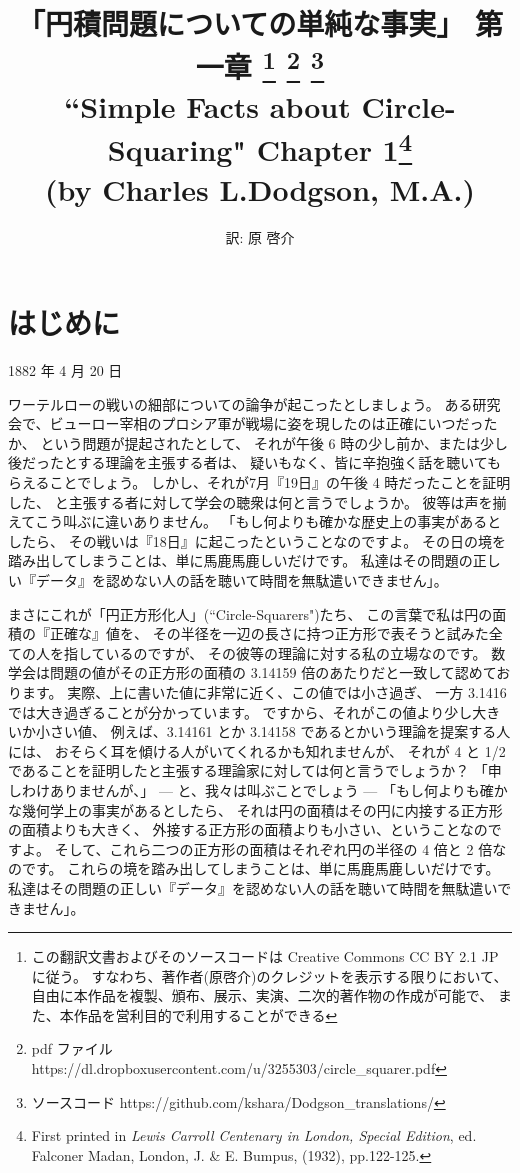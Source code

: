 \documentclass{article}
\title{「円積問題についての単純な事実」 第一章
    \footnote{この翻訳文書およびそのソースコードは
    Creative Commons CC BY 2.1 JP に従う。
    すなわち、著作者(原啓介)のクレジットを表示する限りにおいて、
    自由に本作品を複製、頒布、展示、実演、二次的著作物の作成が可能で、
    また、本作品を営利目的で利用することができる}
    \footnote{pdf ファイル https://dl.dropboxusercontent.com/u/3255303/circle\_squarer.pdf}
    \footnote{ソースコード https://github.com/kshara/Dodgson\_translations/}
    \\
    \smallskip
    {\large
        ``Simple Facts about Circle-Squaring" Chapter 1\footnote{
            First printed in {\it Lewis Carroll Centenary in London,
            Special Edition},
            ed. Falconer Madan, London, J. \& E. Bumpus, (1932), pp.122-125.}
     \\
    (by Charles L.Dodgson, M.A.)
    }
}
\author{訳: 原 啓介}
\begin{document}
\maketitle


\section{はじめに}
\begin{flushright}
1882 年 4 月 20 日
\end{flushright}
 ワーテルローの戦いの細部についての論争が起こったとしましょう。
ある研究会で、ビューロー宰相のプロシア軍が戦場に姿を現したのは正確にいつだったか、
という問題が提起されたとして、
それが午後 6 時の少し前か、または少し後だったとする理論を主張する者は、
疑いもなく、皆に辛抱強く話を聴いてもらえることでしょう。
しかし、それが7月『19日』の午後 4 時だったことを証明した、
と主張する者に対して学会の聴衆は何と言うでしょうか。
彼等は声を揃えてこう叫ぶに違いありません。
「もし何よりも確かな歴史上の事実があるとしたら、
その戦いは『18日』に起こったということなのですよ。
その日の境を踏み出してしまうことは、単に馬鹿馬鹿しいだけです。
私達はその問題の正しい『データ』を認めない人の話を聴いて時間を無駄遣いできません」。

まさにこれが「円正方形化人」(``Circle-Squarers")たち、
この言葉で私は円の面積の『正確な』値を、
その半径を一辺の長さに持つ正方形で表そうと試みた全ての人を指しているのですが、
その彼等の理論に対する私の立場なのです。
数学会は問題の値がその正方形の面積の 3.14159 倍のあたりだと一致して認めております。
実際、上に書いた値に非常に近く、この値では小さ過ぎ、
一方 3.1416 では大き過ぎることが分かっています。
ですから、それがこの値より少し大きいか小さい値、
例えば、3.14161 とか 3.14158 であるとかいう理論を提案する人には、
おそらく耳を傾ける人がいてくれるかも知れませんが、
それが 4 と 1/2 であることを証明したと主張する理論家に対しては何と言うでしょうか？
「申しわけありませんが、」 — と、我々は叫ぶことでしょう —
「もし何よりも確かな幾何学上の事実があるとしたら、
それは円の面積はその円に内接する正方形の面積よりも大きく、
外接する正方形の面積よりも小さい、ということなのですよ。
そして、これら二つの正方形の面積はそれぞれ円の半径の 4 倍と 2 倍なのです。
これらの境を踏み出してしまうことは、単に馬鹿馬鹿しいだけです。
私達はその問題の正しい『データ』を認めない人の話を聴いて時間を無駄遣いできません」。
\end{document}
